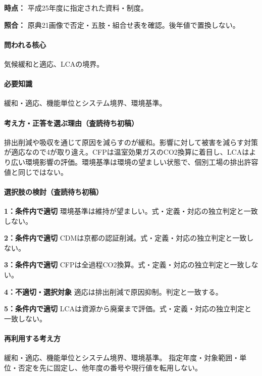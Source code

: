 \noindent\textbf{時点：} 平成25年度に指定された資料・制度。\par

\noindent\textbf{照合：} 原典21画像で否定・五肢・組合せ表を確認。後年値で置換しない。\par

\paragraph{問われる核心} 気候緩和と適応、LCAの境界。

\paragraph{必要知識} 緩和・適応、機能単位とシステム境界、環境基準。

\paragraph{考え方・正答を選ぶ理由（査読待ち初稿）} 排出削減や吸収を通じて原因を減らすのが緩和。影響に対して被害を減らす対策が適応なので4が取り違え。CFPは温室効果ガスのCO2換算に着目し、LCAはより広い環境影響の評価。環境基準は環境の望ましい状態で、個別工場の排出許容値と同じではない。

\paragraph{選択肢の検討（査読待ち初稿）}\mbox{}\par

\noindent\textbf{1：条件内で適切} 環境基準は維持が望ましい。式・定義・対応の独立判定と一致しない。\par

\noindent\textbf{2：条件内で適切} CDMは京都の認証削減。式・定義・対応の独立判定と一致しない。\par

\noindent\textbf{3：条件内で適切} CFPは全過程CO2換算。式・定義・対応の独立判定と一致しない。\par

\noindent\textbf{4：不適切・選択対象} 適応は排出削減で原因抑制。判定と一致する。\par

\noindent\textbf{5：条件内で適切} LCAは資源から廃棄まで評価。式・定義・対応の独立判定と一致しない。\par

\paragraph{再利用する考え方} 緩和・適応、機能単位とシステム境界、環境基準。 指定年度・対象範囲・単位・否定を先に固定し、他年度の番号や現行値を転用しない。

